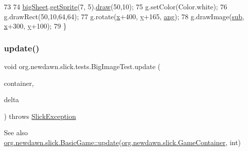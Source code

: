\begin{DoxyCode}
73         
74         \mbox{\hyperlink{classorg_1_1newdawn_1_1slick_1_1tests_1_1_big_image_test_a7c9bcf0eea233f19341717b10fcf949b}{bigSheet}}.\mbox{\hyperlink{classorg_1_1newdawn_1_1slick_1_1_sprite_sheet_af79773fd002b7f1b78ccbf52a8c60319}{getSprite}}(7, 5).\mbox{\hyperlink{classorg_1_1newdawn_1_1slick_1_1_image_a9bddcca05c7140ab45df8ac5b250b6cd}{draw}}(50,10);
75         g.setColor(Color.white);
76         g.drawRect(50,10,64,64);
77         g.rotate(\mbox{\hyperlink{classorg_1_1newdawn_1_1slick_1_1tests_1_1_big_image_test_a6f555917c3173ff62aac2bde25393e95}{x}}+400, \mbox{\hyperlink{classorg_1_1newdawn_1_1slick_1_1tests_1_1_big_image_test_a423ca36ec29a719e670e143236347c77}{y}}+165, \mbox{\hyperlink{classorg_1_1newdawn_1_1slick_1_1tests_1_1_big_image_test_a594a1221b0db224feb5cca1aa62a81a7}{ang}});
78         g.drawImage(\mbox{\hyperlink{classorg_1_1newdawn_1_1slick_1_1tests_1_1_big_image_test_a831175a13c7925f1c7df5819299fcc4a}{sub}}, \mbox{\hyperlink{classorg_1_1newdawn_1_1slick_1_1tests_1_1_big_image_test_a6f555917c3173ff62aac2bde25393e95}{x}}+300, \mbox{\hyperlink{classorg_1_1newdawn_1_1slick_1_1tests_1_1_big_image_test_a423ca36ec29a719e670e143236347c77}{y}}+100);
79     \}
\end{DoxyCode}
\mbox{\label{classorg_1_1newdawn_1_1slick_1_1tests_1_1_big_image_test_a03dcbf53e126be0ac0a78e9a3004390d}} 
\subsubsection{\texorpdfstring{update()}{update()}}
{\footnotesize\ttfamily void org.\+newdawn.\+slick.\+tests.\+Big\+Image\+Test.\+update (\begin{DoxyParamCaption}\item[{\mbox{\hyperlink{classorg_1_1newdawn_1_1slick_1_1_game_container}{Game\+Container}}}]{container,  }\item[{int}]{delta }\end{DoxyParamCaption}) throws \mbox{\hyperlink{classorg_1_1newdawn_1_1slick_1_1_slick_exception}{Slick\+Exception}}\hspace{0.3cm}{\ttfamily [inline]}}

\begin{DoxySeeAlso}{See also}
\mbox{\hyperlink{classorg_1_1newdawn_1_1slick_1_1_basic_game_acfe6fa05aef83bff1631af91a3e4bd20}{org.\+newdawn.\+slick.\+Basic\+Game\+::update}}(\mbox{\hyperlink{classorg_1_1newdawn_1_1slick_1_1_game_container}{org.\+newdawn.\+slick.\+Game\+Container}}, int) 
\end{DoxySeeAlso}



